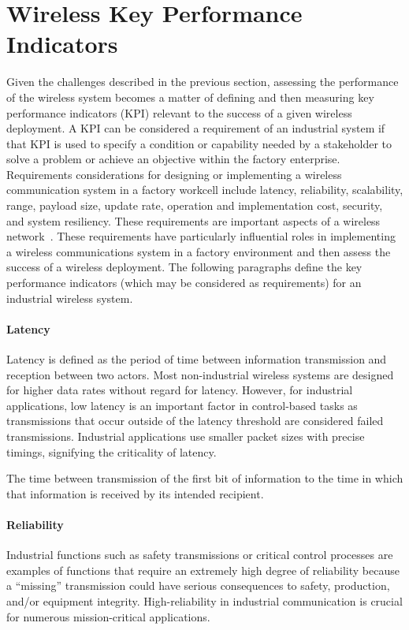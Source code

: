 {\section{Wireless Key Performance Indicators}

Given the challenges described in the previous section, assessing the performance of the wireless system becomes a matter of defining and then measuring key performance indicators (KPI) relevant to the success of a given wireless deployment.  A KPI can be considered a requirement of an industrial system if that KPI is used to specify a condition or capability needed by a stakeholder to solve a problem or achieve an objective within the factory enterprise.  Requirements considerations for designing or implementing a wireless communication system in a factory workcell include latency, reliability, scalability, range, payload size, update rate, operation and implementation cost, security, and system resiliency. These requirements are important aspects of a wireless network~\cite{CandellRW2017}. These requirements have particularly influential roles in implementing a wireless communications system in a factory environment and then assess the success of a wireless deployment.  The following paragraphs define the key performance indicators (which may be considered as requirements) for an industrial wireless system. 

\paragraph{Latency}
Latency is defined as the period of time between information transmission and reception between two actors.  Most non-industrial wireless systems are designed for higher data rates without regard for latency. However, for industrial applications, low latency is an important factor in control-based tasks as transmissions that occur outside of the latency threshold are considered failed transmissions. Industrial applications use smaller packet sizes with precise timings, signifying the criticality of latency.
\begin{definition}[Latency] \label{def:latency}
	The time between transmission of the first bit of information to the time in which that information is received by its intended recipient.
\end{definition}

\paragraph{Reliability}
Industrial functions such as safety transmissions or critical control processes are examples of functions that require an extremely high degree of reliability because a “missing” transmission could have serious consequences to safety, production, and/or equipment integrity. High-reliability in industrial communication is crucial for numerous mission-critical applications. 

}
